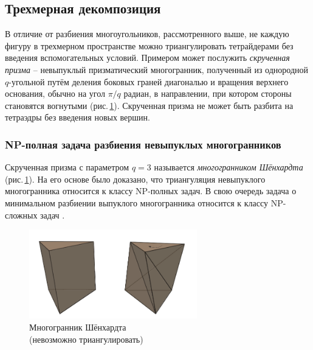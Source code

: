\documentclass[11pt,a4paper]{extarticle}
\begin{document}
		\subsection{Трехмерная декомпозиция}
			В отличие от разбиения многоугольников, рассмотренного выше, не каждую фигуру в трехмерном пространстве можно триангулировать тетрайдерами без введения вспомогательных условий.
			Примером может послужить \emph{скрученная призма} -- невыпуклый призматический многогранник, полученный из однородной $q$-угольной путём деления боковых граней диагональю и вращения верхнего основания,
			обычно на угол $\pi / q$ радиан, в направлении, при котором стороны становятся вогнутыми (рис.\,\ref{shonhard}).
			Скрученная призма не может быть разбита на тетраэдры без введения новых вершин.
			\subsubsection{NP-полная задача разбиения невыпуклых многогранников}
				Скрученная призма с параметром $q=3$ называется \emph{многогранником Шёнхардта} (рис.\,\ref{shonhard}).
				На его основе было доказано, что триангуляция невыпуклого многогранника относится к классу NP-полных задач. 
				В свою очередь задача о минимальном разбиении выпуклого многогранника относится к классу NP-сложных задач \cite{RupSei92}.
				\begin{figure}[ht]
					\centering
					\includegraphics[width=0.65\textwidth]{shonhard}
					\caption{Многогранник Шёнхардта \\(невозможно триангулировать)}
					\label{shonhard}
				\end{figure}
\end{document}
